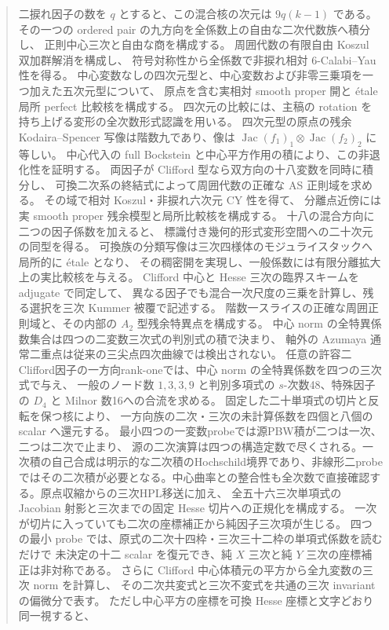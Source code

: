 \begin{abstract}
二捩れ因子の数を $q$ とすると、この混合核の次元は $9q(k-1)$ である。
その一つの ordered pair の九方向を全係数上の自由な二次代数族へ積分し、
正則中心三次と自由な商を構成する。
周囲代数の有限自由 Koszul 双加群解消を構成し、
符号対称性から全係数で非捩れ相対 $6$-Calabi--Yau 性を得る。
中心変数なしの四次元型と、中心変数および非零三乗項を一つ加えた五次元型について、
原点を含む実相対 smooth proper 開と \'etale 局所 perfect 比較核を構成する。
四次元の比較には、主稿の rotation を持ち上げる変形の全次数形式認識を用いる。
四次元型の原点の残余 Kodaira--Spencer 写像は階数九であり、像は
$\operatorname{Jac}(f_1)_1\otimes\operatorname{Jac}(f_2)_2$ に等しい。
中心代入の full Bockstein と中心平方作用の積により、この非退化性を証明する。
両因子が Clifford 型なら双方向の十八変数を同時に積分し、
可換二次系の終結式によって周囲代数の正確な AS 正則域を求める。
その域で相対 Koszul・非捩れ六次元 CY 性を得て、
分離点近傍には実 smooth proper 残余模型と局所比較核を構成する。
十八の混合方向に二つの因子係数を加えると、
標識付き幾何的形式変形空間への二十次元の同型を得る。
可換族の分類写像は三次四様体のモジュライスタックへ局所的に \'etale となり、
その稠密開を実現し、一般係数には有限分離拡大上の実比較核を与える。
Clifford 中心と Hesse 三次の臨界スキームを adjugate で同定して、
異なる因子でも混合一次尺度の三乗を計算し、残る選択を三次 Kummer 被覆で記述する。
階数一スライスの正確な周囲正則域と、その内部の $A_2$ 型残余特異点を構成する。
中心 norm の全特異係数集合は四つの二変数三次式の判別式の積で決まり、
軸外の Azumaya 通常二重点は従来の三尖点四次曲線では検出されない。
任意の許容二Clifford因子の一方向rank-oneでは、中心 norm の全特異係数を四つの三次式で与え、
一般のノード数 $1,3,3,9$ と判別多項式の $s$-次数48、特殊因子の $D_4$ と Milnor 数16への合流を求める。
固定した二十単項式の切片と反転を保つ核により、
一方向族の二次・三次の未計算係数を四個と八個の scalar へ還元する。
最小四つの一変数probeでは源PBW積が二つは一次、二つは二次で止まり、
源の二次演算は四つの構造定数で尽くされる。一次積の自己合成は明示的な二次積のHochschild境界であり、非線形二probeではその二次積が必要となる。中心曲率との整合性も全次数で直接確認する。原点収縮からの三次HPL移送に加え、
全五十六三次単項式の Jacobian 射影と三次までの固定 Hesse 切片への正規化を構成する。
一次が切片に入っていても二次の座標補正から純因子三次項が生じる。
四つの最小 probe では、原式の二次十四枠・三次三十二枠の単項式係数を読むだけで
未決定の十二 scalar を復元でき、純 $X$ 三次と純 $Y$ 三次の座標補正は非対称である。
さらに Clifford 中心体積元の平方から全九変数の三次 norm を計算し、
その二次共変式と三次不変式を共通の三次 invariant の偏微分で表す。
ただし中心平方の座標を可換 Hesse 座標と文字どおり同一視すると、

\end{abstract}
